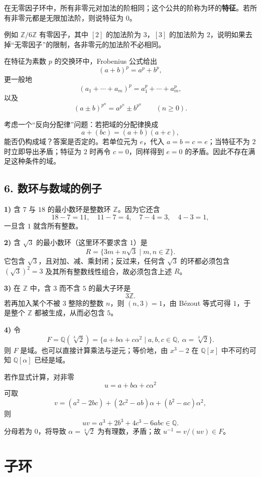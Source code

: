 在无零因子环中，所有非零元对加法的阶相同；这个公共的阶称为环的\textbf{特征}。若所有非零元都是无限加法阶，则说特征为 $0$。

例如 $\mathbb Z/6\mathbb Z$ 有零因子，其中 $[2]$ 的加法阶为 $3$，$[3]$ 的加法阶为 $2$，说明如果去掉“无零因子”的限制，各非零元的加法阶不必相同。

在特征为素数 $p$ 的交换环中，Frobenius 公式给出
\[
(a+b)^p=a^p+b^p,
\]
更一般地
\[
(a_1+\cdots+a_m)^p=a_1^p+\cdots+a_m^p,
\]
以及
\[
(a\pm b)^{p^n}=a^{p^n}\pm b^{p^n}\qquad(n\ge0).
\]

考虑一个“反向分配律”问题：若把域的分配律换成
\[
a+(bc)=(a+b)(a+c),
\]
能否仍构成域？答案是否定的。若单位元为 $e$，代入 $a=b=c=e$；当特征不为 $2$ 时立即导出矛盾；特征为 $2$ 时再令 $c=0$，同样得到 $e=0$ 的矛盾。因此不存在满足这种条件的域。

\subsection*{6. 数环与数域的例子}

\textbf{1)} 含 $7$ 与 $18$ 的最小数环是整数环 $\mathbb Z$。因为它还含
\[
18-7=11,
\quad 11-7=4,
\quad 7-4=3,
\quad 4-3=1,
\]
一旦含 $1$ 就含所有整数。

\textbf{2)} 含 $\sqrt3$ 的最小数环（这里环不要求含 $1$）是
\[
R=\{3m+n\sqrt3\mid m,n\in\mathbb Z\}.
\]
它包含 $\sqrt3$，且对加、减、乘封闭；反过来，任何含 $\sqrt3$ 的环都必须包含 $(\sqrt3)^2=3$ 及其所有整数线性组合，故必须包含上述 $R$。

\textbf{3)} 在 $\mathbb Z$ 中，含 $3$ 而不含 $5$ 的最大子环是
\[
3\mathbb Z.
\]
若再加入某个不被 $3$ 整除的整数 $n$，则 $(n,3)=1$，由 Bézout 等式可得 $1$，于是整个 $\mathbb Z$ 都被生成，从而必包含 $5$。

\textbf{4)} 令
\[
F=\mathbb Q(\sqrt[3]{2})
=\{a+b\alpha+c\alpha^2\mid a,b,c\in\mathbb Q,\ \alpha=\sqrt[3]{2}\}.
\]
则 $F$ 是域。也可以直接计算乘法与逆元；等价地，由 $x^3-2$ 在 $\mathbb Q[x]$ 中不可约可知 $\mathbb Q[\alpha]$ 已经是域。

若作显式计算，对非零
\[
u=a+b\alpha+c\alpha^2
\]
可取
\[
v=(a^2-2bc)+(2c^2-ab)\alpha+(b^2-ac)\alpha^2,
\]
则
\[
uv=a^3+2b^3+4c^3-6abc\in\mathbb Q.
\]
分母若为 $0$，将导致 $\alpha=\sqrt[3]2$ 为有理数，矛盾；故 $u^{-1}=v/(uv)\in F$。

\section{子环}

